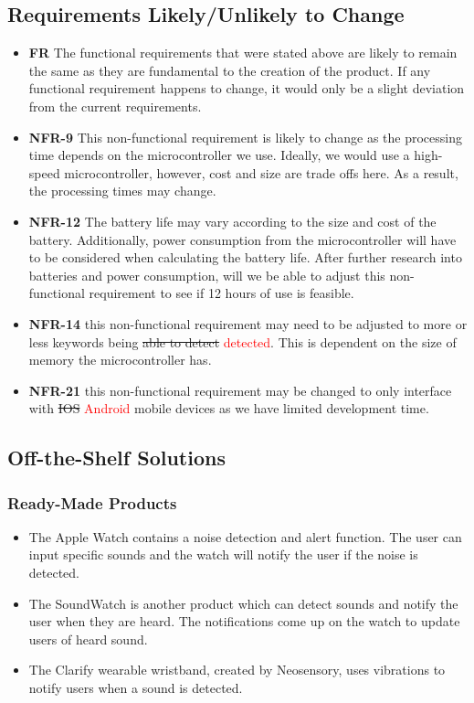 \documentclass[12pt]{article}
\begin{document}
\subsection{Requirements Likely/Unlikely to Change}
\begin{itemize}
  \item \textbf{FR} The functional requirements that were stated above are likely to remain the same as they are fundamental to the creation of the product. If any functional requirement happens to change, it would only be a slight deviation from the current requirements.
  \item \textbf{NFR-9} This non-functional requirement is likely to change as the processing time depends on the microcontroller we use. Ideally, we would use a high-speed microcontroller, however, cost and size are trade offs here. As a result, the processing times may change.
  \item \textbf{NFR-12} The battery life may vary according to the size and cost of the battery. Additionally, power consumption from the microcontroller will have to be considered when calculating the battery life. After further research into batteries and power consumption, will we be able to adjust this non-functional requirement to see if 12 hours of use is feasible.
  \item \textbf{NFR-14} this non-functional requirement may need to be adjusted to more or less keywords being \sout{able to detect} \textcolor{red}{detected}. This is dependent on the size of memory the microcontroller has.
  \item \textbf{NFR-21} this non-functional requirement may be changed to only interface with \sout{IOS} \textcolor{red}{Android} mobile devices as we have limited development time.
\end{itemize}

\subsection{Off-the-Shelf Solutions} 

\subsubsection{Ready-Made Products}
\label{readymade}
\begin{itemize}
  \item The Apple Watch contains a noise detection and alert function. The user can input specific sounds and the watch will notify the user if the noise is detected.
  \item The SoundWatch is another product which can detect sounds and notify the user when they are heard. The notifications come up on the watch to update users of heard sound.
  \item The Clarify wearable wristband, created by Neosensory, uses vibrations to notify users when a sound is detected.
\end{itemize}
\end{document}
